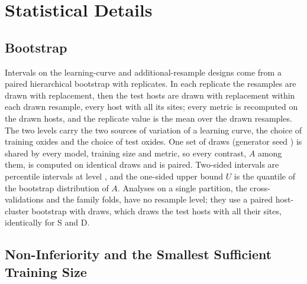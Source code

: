 \section{Statistical Details}
\label{app:stats}

\subsection{Bootstrap}

Intervals on the learning-curve and additional-resample designs come from a paired hierarchical bootstrap \citep{Efron1979bootstrap,Efron1993introduction} with \numCfgAnalysisBootstrapDraws{} replicates. In each replicate the resamples are drawn with replacement, then the test hosts are drawn with replacement within each drawn resample, every host with all its sites; every metric is recomputed on the drawn hosts, and the replicate value is the mean over the drawn resamples. The two levels carry the two sources of variation of a learning curve, the choice of training oxides and the choice of test oxides. One set of draws (generator seed \numGOnePrimaryBootstrapSeed{}) is shared by every model, training size and metric, so every contrast, $A$ among them, is computed on identical draws and is paired. Two-sided intervals are percentile intervals at level \numCfgAnalysisDisplayCi{}, and the one-sided upper bound $U$ is the \numCfgAnalysisNStarUpperQuantile{} quantile of the bootstrap distribution of $A$. Analyses on a single partition, the cross-validations and the family folds, have no resample level; they use a paired host-cluster bootstrap with \numCfgStatsClusterBootstrapN{} draws, which draws the test hosts with all their sites, identically for S and D.

\subsection{Non-Inferiority and the Smallest Sufficient Training Size}

